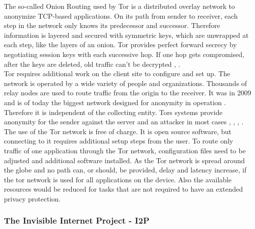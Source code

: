         The so-called Onion Routing used  by Tor is a distributed overlay network to anonymize TCP-based applications. On its path from sender to receiver, each step in the network only knows its predecessor and successor. Therefore information is layered and secured with symmetric keys, which are unwrapped at each step, like the layers of an onion.
        Tor provides perfect forward secrecy by negotiating session keys with each successive hop. If one hop gets compromised, after the keys are deleted, old traffic can't be decrypted \cite{dingledine_tor_2004}, \cite{borisov_shining_2008}.\\
        Tor requires additional work on the client site to configure and set up. 
        The network is operated by a wide variety of people and organizations.
        Thousands of relay nodes are used to route traffic from the origin to the receiver. It was in 2009 and is of today the biggest network designed for anonymity in operation \cite{edman_anonymity_2009}.
        Therefore it is independent of the collecting entity. Tors systems provide anonymity for the sender against the server and an attacker in most cases \cite{arma_one_2009},  \cite{poulsen_feds_2013}, \cite{samson_tor_2013}, \cite{herrmann_website_2009}.\\
        The use of the Tor network is free of charge. It is open source software, but connecting to it requires additional setup steps from the user. To route only traffic of one application through the Tor network, configuration files need to be adjusted and additional software installed. As the Tor network is spread around the globe and no path can, or should, be provided, delay and latency increase, if the tor network is used for all applications on the device. Also the available resources would be reduced for tasks that are not required to have an extended privacy protection.
    
    \subsubsection{The Invisible Internet Project - I2P}
    

